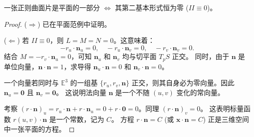 \documentclass[lang=cn,10pt,thmcnt=section]{elegantbook}
\renewcommand{\vec}[1]{\mathbf{#1}}
\begin{document}
\begin{proposition}
    一张正则曲面片是平面的一部分 $\iff$ 其第二基本形式恒为零 ($II \equiv 0$)。
\end{proposition}
\begin{proof}
    ($\Rightarrow$) 已在平面范例中证明。
    
    ($\Leftarrow$) 若 $II \equiv 0$，则 $L=M=N=0$。这意味着：
    \[
    -r_u \cdot \vec{n}_u = 0, \quad -r_u \cdot \vec{n}_v = 0, \quad -r_v \cdot \vec{n}_v = 0.
    \]
    结合 $M = -r_v \cdot \vec{n}_u = 0$，可知 $\vec{n}_u$ 和 $\vec{n}_v$ 均与切平面 $T_pS$ 正交。
    同时，由于 $\vec{n}$ 是单位向量，$\vec{n}\cdot\vec{n}=1$，求导得 $\vec{n}_u \cdot \vec{n}=0$ 和 $\vec{n}_v \cdot \vec{n}=0$。
    
    一个向量若同时与 $\mathbb{E}^3$ 的一组基 $\{r_u, r_v, \vec{n}\}$ 正交，则其自身必为零向量。因此 $\vec{n}_u = \vec{0}$ 且 $\vec{n}_v = \vec{0}$。
    这说明法向量 $\vec{n}$ 是一个不随 $(u,v)$ 变化的常向量。
    
    考察 $(r \cdot \vec{n})_u = r_u \cdot \vec{n} + r \cdot \vec{n}_u = 0 + r \cdot \vec{0} = 0$。同理 $(r \cdot \vec{n})_v = 0$。
    这表明标量函数 $r(u,v) \cdot \vec{n}$ 是一个常数，记为 $C$。
    方程 $r \cdot \vec{n} = C$ (或 $\vec{x} \cdot \vec{n} = C$) 正是三维空间中一张平面的方程。
\end{proof}
\end{document}
